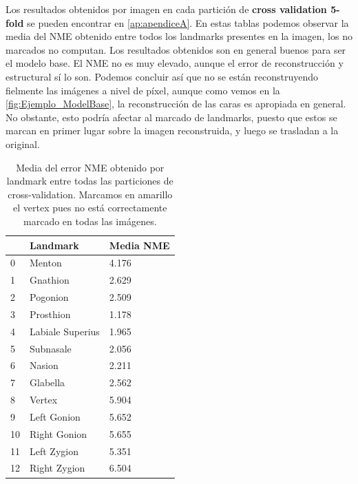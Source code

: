         \noindent Los resultados obtenidos por imagen en cada partición de \textbf{cross validation 5-fold } se pueden encontrar en \autoref{ap:apendiceA}. En estas tablas podemos observar la media del NME obtenido entre todos los landmarks presentes en la imagen, los no marcados no computan. Los resultados obtenidos son en general buenos para ser el modelo base. El NME no es muy elevado, aunque el error de reconstrucción y estructural sí lo son. Podemos concluir así que no se están reconstruyendo fielmente las imágenes a nivel de píxel, aunque como vemos en la \autoref{fig:Ejemplo_ModelBase}, la reconstrucción de las caras es apropiada en general. No obstante, esto podría afectar al marcado de landmarks, puesto que estos se marcan en primer lugar sobre la imagen reconstruida, y luego se trasladan a la original.

        \begin{table}[!ht]
            \centering
            \caption{Media del error NME obtenido por landmark entre todas las particiones de cross-validation. Marcamos en amarillo el vertex pues no está correctamente marcado en todas las imágenes.}
            \begin{tabular}{|l|l|l|}
            \hline
                ~ & \cellcolor{gray!25}\textbf{Landmark} & \cellcolor{gray!25}\textbf{Media NME} \\ \hline
                0 & Menton & 4.176 \\ \hline
                1 & Gnathion & 2.629 \\ \hline
                2 & Pogonion & 2.509 \\ \hline
                3 & Prosthion & 1.178 \\ \hline
                4 & Labiale Superius & 1.965 \\ \hline
                5 & Subnasale & 2.056 \\ \hline
                6 & Nasion & 2.211 \\ \hline
                7 & Glabella & 2.562 \\ \hline
                \cellcolor{yellow!50}8 & \cellcolor{yellow!50}Vertex & \cellcolor{yellow!50}5.904 \\ \hline
                9 & Left Gonion & 5.652 \\ \hline
                10 & Right Gonion & 5.655 \\ \hline
                11 & Left Zygion & 5.351 \\ \hline
                12 & Right Zygion & 6.504 \\ \hline

\end{tabular}
\end{table}
